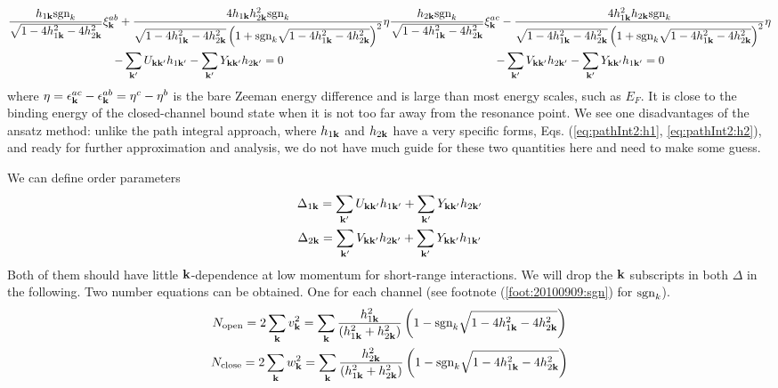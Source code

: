 \begin{subequations}\label{eq:20100909:fullgap}
\begin{multline}
\frac{h_{1\vk}\sgn_k}{\sqrt{1-4 h_{1\vk}^2-4 h_{2\vk}^2}} \xi^{ab}_{\vk}+\frac{4 h_{1\vk} h_{2\vk}^2\sgn_{k}}{\sqrt{1-4 h_{1\vk}^2-4 h_{2\vk}^2} \left(1+\sgn_{k}\sqrt{1-4 h_{1\vk}^2-4 h_{2\vk}^2}\right)^2}\eta\\
-\sum_{\vk'}U_{\vk\vk'}h_{1\vk'}-\sum_{\vk'}Y_{\vk\vk'}h_{2\vk'}=0
\label{eq:20100909:fullgapa}
\end{multline}
\begin{multline}
\frac{h_{2\vk}\sgn_k}{\sqrt{1-4 h_{1\vk}^2-4 h_{2\vk}^2}} \xi^{ac}_{\vk}-\frac{4 h_{1\vk}^{2} h_{2\vk}\sgn_{k}}{\sqrt{1-4 h_{1\vk}^2-4 h_{2\vk}^2} \left(1+\sgn_{k}\sqrt{1-4 h_{1\vk}^2-4 h_{2\vk}^2}\right)^2}\eta\\
-\sum_{\vk'}V_{\vk\vk'}h_{2\vk'}-\sum_{\vk'}Y_{\vk\vk'}h_{1\vk'}=0
\label{eq:20100909:fullgapb}
\end{multline}
\end{subequations}
where $\eta=\epsilon^{ac}_{\mathbf{k}}-\epsilon^{ab}_{\mathbf{k}}=\eta^{c}-\eta^{b}$ is the bare Zeeman energy difference and is large than most energy scales, such as $E_{F}$.  It is close to  the binding energy of the closed-channel bound state when it is not too far away from the resonance point.   We see one  disadvantages of the ansatz method: unlike the path integral approach, where $h_{1\mathbf{k}}$ and $h_{2\mathbf{k}}$ have a very specific forms, Eqs. (\ref{eq:pathInt2:h1}, \ref{eq:pathInt2:h2}), and ready for further approximation and analysis,  we do not have much guide for these two quantities here and need to make some guess.  

We can define order parameters
\begin{gather}
\Delta_{1\mathbf{k}}=\sum_{\mathbf{k}'}U_{\mathbf{k}\mathbf{k}'}h_{1\mathbf{k}'}+\sum_{\mathbf{k}'}Y_{\mathbf{k}\mathbf{k}'}h_{2\mathbf{k}'}\\
\Delta_{2\mathbf{k}}=\sum_{\mathbf{k}'}V_{\mathbf{k}\mathbf{k}'}h_{2\mathbf{k}'}+\sum_{\mathbf{k}'}Y_{\mathbf{k}\mathbf{k}'}h_{1\mathbf{k}'}
\end{gather}
Both of them should have little $\mathbf{k}$-dependence at low momentum for short-range interactions.  We will drop the $\mathbf{k}$ subscripts in both $\Delta$ in the following. 
Two number equations can be obtained.  One for each channel (see footnote (\ref{foot:20100909:sgn}) for $\text{sgn}_{k}$).
\begin{subequations}\label{eq:20100909:number}
\begin{gather}
N_{\text{open}}=2\sum_{\mathbf{k}}v_{\mathbf{k}}^{2}
	=\sum_{\mathbf{k}}\frac{ h_{1\mathbf{k}}^2}{( h_{1\mathbf{k}}^2+ h_{2\mathbf{k}}^2)} \left(1-\text{sgn}_{k}\sqrt{1-4 h_{1\mathbf{k}}^2-4 h_{2\mathbf{k}}^2}\right)
	\label{eq:meanfield:opennum}\\
N_{\text{close}}=2\sum_{\mathbf{k}}w_{\mathbf{k}}^{2}
	=\sum_{\mathbf{k}}\frac{ h_{2\mathbf{k}}^2}{( h_{1\mathbf{k}}^2+ h_{2\mathbf{k}}^2)} \left(1-\text{sgn}_{k}\sqrt{1-4 h_{1\mathbf{k}}^2-4 h_{2\mathbf{k}}^2}\right)
\end{gather} 
\end{subequations}



